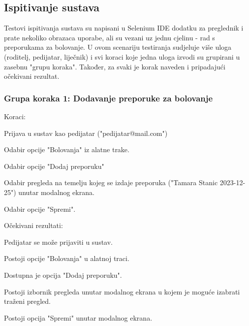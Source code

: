			\subsection{Ispitivanje sustava}
			Testovi ispitivanja sustava su napisani u Selenium IDE dodatku za preglednik i prate nekoliko obrazaca uporabe, ali su vezani uz jednu cjelinu - rad s preporukama za bolovanje.
			U ovom scenariju testiranja sudjeluje više uloga (roditelj, pedijatar, liječnik) i svi koraci koje jedna uloga izvodi su grupirani u zasebnu "grupu koraka". Također, za svaki je korak
			naveden i pripadajući očekivani rezultat.
			
			 \subsubsection*{Grupa koraka 1: Dodavanje preporuke za bolovanje}
			 Koraci:
			 \begin{packed_enum}
				\item Prijava u sustav kao pedijatar ("pedijatar@mail.com")
				\item Odabir opcije "Bolovanja" iz alatne trake.
				\item Odabir opcije "Dodaj preporuku"
				\item Odabir pregleda na temelju kojeg se izdaje preporuka ("Tamara Stanic 2023-12-25") unutar modalnog ekrana.
				\item Odabir opcije "Spremi".
			 \end{packed_enum}
			 Očekivani rezultati:
			 \begin{packed_enum}
				\item Pedijatar se može prijaviti u sustav.
				\item Postoji opcije "Bolovanja" u alatnoj traci.
				\item Dostupna je opcija "Dodaj preporuku".
				\item Postoji izbornik pregleda unutar modalnog ekrana u kojem je moguće izabrati traženi pregled.
				\item Postoji opcija "Spremi" unutar modalnog ekrana.
			 \end{packed_enum}
	
